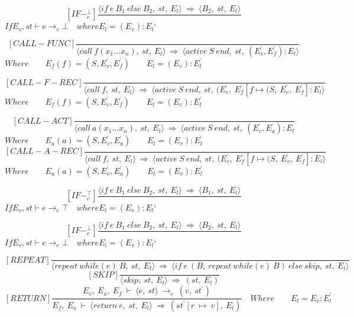 \[
[IF-^{\bot}_e]
\dfrac{\langle if \ e \ B_1 \ else \ B_2, \ st, \ E_l \rangle \ \Rightarrow \ \langle B_2, \ st, \ E_l \rangle}{}
\]
\begin{math}
	If E_v, st \vdash e \rightarrow_e \bot \quad where E_l = (E_v) : E_l{‘}
\end{math}

\[
[CALL-FUNC]
\dfrac{}{ \langle call \ f(x_1 … x_n), \ st, \ E_l \rangle \ \Rightarrow \ \langle active \ S \ end, \ st, \ (E_v^{‘}, E_f^{‘}) : E_l \rangle}
\]
\begin{math}
	Where 
	\qquad E_f(f) = (S, E_v^{‘}, E_f^{‘})
	\qquad E_l = (E_v) : E_l^{‘}
\end{math}

\[
[CALL-F-REC]
\dfrac{}{ \langle call \ f, \ st, \ E_l \rangle \ \Rightarrow \ \langle active \ S \ end, \ st, \ (E_v^{‘}, \ E_f^{‘}[f \mapsto (S, \ E_v^{‘}, \ E_f^{‘}] : E_l \rangle}
\]
\begin{math}
	Where
	\qquad E_f(f) = (S, E_v^{‘}, E_f^{‘}) 
	\qquad E_l = (E_v) : E_l^{‘}
\end{math}

\[
[CALL-ACT]
\dfrac{}{ \langle call \ a(x_1 … x_n), \ st, \ E_l \rangle \ \Rightarrow \ \langle active \ S \ end, \ st, \ (E_v^{‘}, E_a^{‘}) : E_l}
\]
\begin{math}
	Where
	\qquad E_a(a) = (S, E_v^{‘}, E_a^{‘})
	\qquad E_l = (E_v) : E_l^{‘}
\end{math}
\[
[CALL-A-REC]
\dfrac{}{ \langle call \ f, \ st, \ E_l \rangle \ \Rightarrow \ \langle active \ S \ end, \ st, \ (E_v^{‘}, \ E_f^{‘}[f \mapsto (S, \ E_v^{‘}, \ E_f^{‘}] : E_l \rangle}
\]
\begin{math}
	Where
	\qquad E_a(a) = (S, E_v^{‘}, E_a^{‘})
	\qquad E_l = (E_v) : E_l^{‘}		
\end{math}

\[
[IF-^{\top}_e]
\dfrac{\langle if \ e \ B_1 \ else \ B_2, \ st, \ E_l \rangle \ \Rightarrow \ \langle B_1, \ st, \ E_l \rangle}{}
\]
\begin{math}
	If E_v, st \vdash e \rightarrow_e \top \quad where E_l = (E_v) : E_l{‘}
\end{math}

\[
[IF-^{\bot}_e]
\dfrac{\langle if \ e \ B_1 \ else \ B_2, \ st, \ E_l \rangle \ \Rightarrow \ \langle B_2, \ st, \ E_l \rangle}{}
\]
\begin{math}
	If E_v, st \vdash e \rightarrow_e \bot \quad where E_l = (E_v) : E_l{‘}
\end{math}

\[
[REPEAT]
\dfrac{}{\langle repeat \ while(e) \ B, \ st, \ E_l \rangle \ \Rightarrow \ \langle if \ e \ (B; \ repeat \ while(e) \ B) \ else \ skip, \ st, \ E_l \rangle}
\]\newline
\[
[SKIP]
\dfrac{}{\langle skip, \ st, \ E_l \rangle \ \Rightarrow \ (st, \ E_l)}
\]\newline
\[
[RETURN]	
\dfrac{E_v, \ E_a, \ E_f \ \vdash \ \langle e, \ st \rangle \ \rightarrow_e \ (v, \ st^{'})}{E_f, \ E_a \ \vdash \ \langle return \ e, \ st, \ E_l \rangle \ \Rightarrow \ (st^{'}[r \ \mapsto \ v], \ E_l)}
\quad Where	
\qquad E_l = E_v : E_l^{'}	
\]\newline


